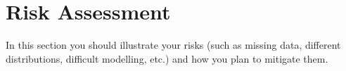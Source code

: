 \section{Risk Assessment}
\label{sec:risk_assessment}
In this section you should illustrate your risks (such as missing data, different distributions, difficult modelling, etc.) and how you plan to mitigate them. 
